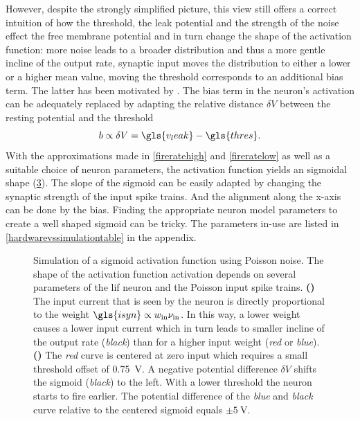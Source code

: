 However, despite the strongly simplified picture, this view still offers a correct intuition of how the threshold, the leak potential and the strength of the noise effect the free membrane potential and in turn change the shape of the activation function: more noise leads to a broader distribution and thus a more gentle incline of the output rate, synaptic input moves the distribution to either a lower or a higher mean value, moving the threshold corresponds to an additional bias term. The latter has been motivated by \citealp{petrovici2016stochastic}. The bias term in the neuron's activation can be adequately replaced by adapting the relative distance $\delta V$ between the resting potential and the threshold
\begin{equation}
b \propto \delta V = \gls{v_leak} - \gls{thres}.
\end{equation}
With the approximations made in \cref{fireratehigh} and \cref{fireratelow} as well as a suitable choice of neuron parameters, the activation function yields an sigmoidal shape (\cref{theoreticalactivationfunction}). The slope of the sigmoid can be easily adapted by changing the synaptic strength of the input spike trains. And the alignment along the x-axis can be done by the bias. Finding the appropriate neuron model parameters to create a well shaped sigmoid can be tricky. The parameters in-use are listed in \cref{hardwarevssimulationtable} in the appendix.

\begin{figure}[h!]
	\begin{subfigure}[c]{0.5\textwidth}
		\centering
		\caption{}
		
		\label{theoreticalactivationfunctionweight}
	\end{subfigure}	
	\begin{subfigure}[c]{0.5\textwidth}
		\centering
		\caption{}
		
		\label{theoreticalactivationfunctionbias}
	\end{subfigure}
	\caption[Simulation of a sigmoid activation function using Poisson noise]{Simulation of a sigmoid activation function using Poisson noise. The shape of the activation function \gls{activation} depends on several parameters of the \gls{lif} neuron and the Poisson input  spike trains. \textbf{()} The input current that is seen by the neuron is directly proportional to the weight $\gls{isyn} \propto w_\text{in} \nu_\text{in}$. In this way, a lower weight causes a lower input current which in turn leads to smaller incline of the output rate (\emph{black}) than for a higher input weight (\emph{red} or \emph{blue}). \textbf{()} The \emph{red} curve is centered at zero input which requires a small threshold offset of \SI{0.75}{\V}. A negative potential difference $\delta V$ shifts the sigmoid (\emph{black}) to the left. With a lower threshold the neuron starts to fire earlier. The potential difference of the \emph{blue} and \emph{black} curve relative to the centered sigmoid equals $\pm \SI{5}{\V}$.}
	\label{theoreticalactivationfunction}
\end{figure}

